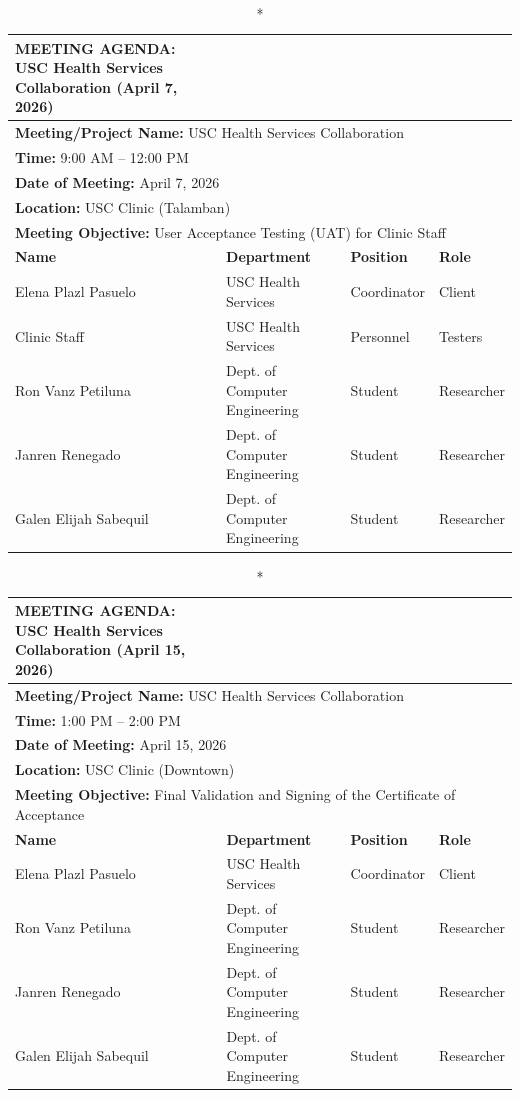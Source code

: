 \begin{longtable}{|p{4cm}|p{4cm}|p{3cm}|p{3cm}|}
\caption*{MEETING AGENDA: USC Health Services Collaboration (April 7, 2026)} \\
\hline
\multicolumn{4}{|l|}{\textbf{Meeting/Project Name:} USC Health Services Collaboration} \\
\multicolumn{4}{|l|}{\textbf{Time:} 9:00 AM – 12:00 PM} \\
\multicolumn{4}{|l|}{\textbf{Date of Meeting:} April 7, 2026} \\
\multicolumn{4}{|l|}{\textbf{Location:} USC Clinic (Talamban)} \\
\multicolumn{4}{|l|}{\textbf{Meeting Objective:} User Acceptance Testing (UAT) for Clinic Staff} \\
\hline
\textbf{Name} & \textbf{Department} & \textbf{Position} & \textbf{Role} \\
\hline
Elena Plazl Pasuelo & USC Health Services & Coordinator & Client \\
\hline
Clinic Staff & USC Health Services & Personnel & Testers \\
\hline
Ron Vanz Petiluna & Dept. of Computer Engineering & Student & Researcher \\
\hline
Janren Renegado & Dept. of Computer Engineering & Student & Researcher \\
\hline
Galen Elijah Sabequil & Dept. of Computer Engineering & Student & Researcher \\
\hline
\end{longtable}

\begin{longtable}{|p{4cm}|p{4cm}|p{3cm}|p{3cm}|}
\caption*{MEETING AGENDA: USC Health Services Collaboration (April 15, 2026)} \\
\hline
\multicolumn{4}{|l|}{\textbf{Meeting/Project Name:} USC Health Services Collaboration} \\
\multicolumn{4}{|l|}{\textbf{Time:} 1:00 PM – 2:00 PM} \\
\multicolumn{4}{|l|}{\textbf{Date of Meeting:} April 15, 2026} \\
\multicolumn{4}{|l|}{\textbf{Location:} USC Clinic (Downtown)} \\
\multicolumn{4}{|l|}{\textbf{Meeting Objective:} Final Validation and Signing of the Certificate of Acceptance} \\
\hline
\textbf{Name} & \textbf{Department} & \textbf{Position} & \textbf{Role} \\
\hline
Elena Plazl Pasuelo & USC Health Services & Coordinator & Client \\
\hline
Ron Vanz Petiluna & Dept. of Computer Engineering & Student & Researcher \\
\hline
Janren Renegado & Dept. of Computer Engineering & Student & Researcher \\
\hline
Galen Elijah Sabequil & Dept. of Computer Engineering & Student & Researcher \\
\hline
\end{longtable}
